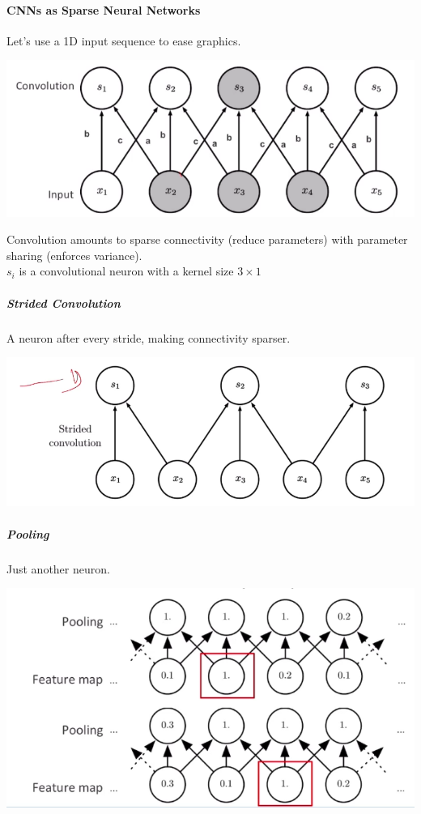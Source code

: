 \documentclass[10pt]{report}
\begin{document}
\paragraph{CNNs as Sparse Neural Networks}
Let's use a 1D input sequence to ease graphics.
\begin{center}
	\includegraphics[scale=0.5]{57.png}
\end{center}
Convolution amounts to sparse connectivity (reduce parameters) with parameter sharing (enforces variance).\\
$s_i$ is a convolutional neuron with a kernel size $3\times1$
\subparagraph{Strided Convolution} A neuron after every stride, making connectivity sparser.
\begin{center}
	\includegraphics[scale=0.5]{58.png}
\end{center}
\subparagraph{Pooling} Just another neuron.
\begin{center}
	\includegraphics[scale=0.5]{59.png}
\end{center}
\end{document}
